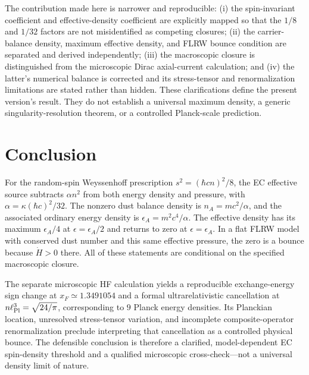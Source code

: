 \documentclass[11pt]{article}
\begin{document}
The contribution made here is narrower and reproducible: (i) the spin-invariant coefficient and effective-density coefficient are explicitly mapped so that the $1/8$ and $1/32$ factors are not misidentified as competing closures; (ii) the carrier-balance density, maximum effective density, and FLRW bounce condition are separated and derived independently; (iii) the macroscopic closure is distinguished from the microscopic Dirac axial-current calculation; and (iv) the latter's numerical balance is corrected and its stress-tensor and renormalization limitations are stated rather than hidden. These clarifications define the present version's result. They do not establish a universal maximum density, a generic singularity-resolution theorem, or a controlled Planck-scale prediction.

\section{Conclusion}
For the random-spin Weyssenhoff prescription $s^2=(\hbar c n)^2/8$, the EC effective source subtracts $\alpha n^2$ from both energy density and pressure, with $\alpha=\kappa(\hbar c)^2/32$. The nonzero dust balance density is $n_A=mc^2/\alpha$, and the associated ordinary energy density is $\epsilon_A=m^2c^4/\alpha$. The effective density has its maximum $\epsilon_A/4$ at $\epsilon=\epsilon_A/2$ and returns to zero at $\epsilon=\epsilon_A$. In a flat FLRW model with conserved dust number and this same effective pressure, the zero is a bounce because $\dot H>0$ there. All of these statements are conditional on the specified macroscopic closure.

The separate microscopic HF calculation yields a reproducible exchange-energy sign change at $x_F\simeq1.3491054$ and a formal ultrarelativistic cancellation at $n\ell_{\rm Pl}^3=\sqrt{24/\pi}$, corresponding to $9$ Planck energy densities. Its Planckian location, unresolved stress-tensor variation, and incomplete composite-operator renormalization preclude interpreting that cancellation as a controlled physical bounce. The defensible conclusion is therefore a clarified, model-dependent EC spin-density threshold and a qualified microscopic cross-check—not a universal density limit of nature.
\end{document}
